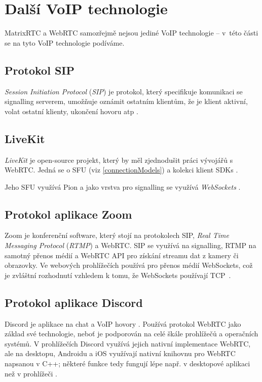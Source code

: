 \section{Další VoIP technologie}\label{voipTech}

MatrixRTC a WebRTC samozřejmě nejsou jediné VoIP technologie -- v~této části se
na tyto VoIP technologie podíváme.

\subsection{Protokol SIP}

\textit{Session Initiation Protocol} (\textit{SIP}) je protokol, který
specifikuje komunikaci se signalling serverem, umožňuje oznámit ostatním
klientům, že je klient aktivní, volat ostatní klienty, ukončení hovoru atp \parencite{ExtraHop-SIPOverview}.

\subsection{LiveKit}

\textit{LiveKit} je open-source projekt, který by měl zjednodušit práci vývojářů
s WebRTC. Jedná se o SFU (viz \ref{connectionModels}) a kolekci klient SDKs
\parencite{LiveKit-Homepage,GitHub-LiveKit}.

Jeho SFU využívá Pion a jako vrstva pro signalling se využívá
\textit{WebSockets} \parencite{GitHub-LiveKit}.

\subsection{Protokol aplikace Zoom}

Zoom je konferenční software, který stojí na protokolech SIP, \textit{Real Time
    Messaging Protocol} (\textit{RTMP}) a WebRTC. SIP se využívá na signalling,
RTMP na samotný přenos médií a WebRTC API pro získání streamu dat z kamery
či obrazovky. Ve webových prohlížečích používá pro přenos médií WebSockets,
což je zvláštní rozhodnutí vzhledem k tomu, že WebSockets používají TCP~\parencite{WebRTCHacks-HowZoomAvoidWebRTC,EBODigital-HowDoesZoomWork,
    Zoom-Homepage}.

\subsection{Protokol aplikace Discord}

Discord je aplikace na chat a VoIP hovory \parencite{Discord-WhatIsDiscord}. Používá
protokol WebRTC jako základ své technologie, neboť je podporován na celé škále
prohlížečů a operačních systémů. V prohlížečích Discord využívá jejich nativní
implementace WebRTC, ale na desktopu, Androidu a iOS využívají nativní knihovnu
pro WebRTC napsanou v C++; některé funkce tedy fungují lépe např. v desktopové
aplikaci než v prohlížeči \parencite{Discord-HowDoesItHandleMillionsOfUsers}.

